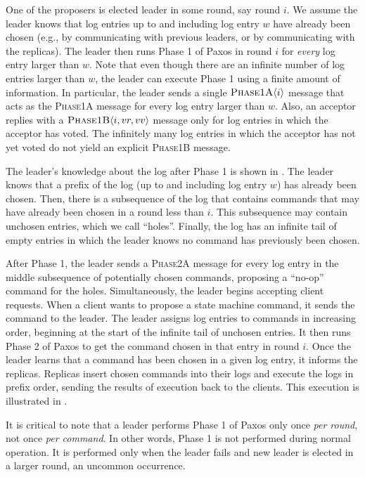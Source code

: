 One of the proposers is elected leader in some round, say round $i$. We assume
the leader knows that log entries up to and including log entry $w$ have
already been chosen (e.g., by communicating with previous leaders, or by
communicating with the replicas). The leader then runs Phase 1 of Paxos in
round $i$ for \emph{every} log entry larger than $w$. Note that even though
there are an infinite number of log entries larger than $w$, the leader can
execute Phase 1 using a finite amount of information.  In particular, the
leader sends a single $\textsc{Phase1A}\langle{i}\rangle$ message that acts as the \textsc{Phase1A}
message for every log entry larger than $w$. Also, an acceptor replies with a
$\textsc{Phase1B}\langle{i, vr, vv}\rangle$ message only for log entries in which the acceptor has
voted. The infinitely many log entries in which the acceptor has not yet voted
do not yield an explicit \textsc{Phase1B} message.

%

The leader's knowledge about the log after Phase 1 is shown in
. The leader knows that a prefix of the log (up to
and including log entry $w$) has already been chosen. Then, there is a
subsequence of the log that contains commands that may have already been chosen
in a round less than $i$. This subsequence may contain unchosen entries, which
we call ``holes''. Finally, the log has an infinite tail of empty entries in
which the leader knows no command has previously been chosen.

{}

After Phase 1, the leader sends a \textsc{Phase2A} message for every log entry
in the middle subsequence of potentially chosen commands, proposing a ``no-op''
command for the holes. Simultaneously, the leader begins accepting client
requests. When a client wants to propose a state machine command, it sends the
command to the leader. The leader assigns log entries to commands in increasing
order, beginning at the start of the infinite tail of unchosen entries. It then
runs Phase 2 of Paxos to get the command chosen in that entry in round $i$.
Once the leader learns that a command has been chosen in a given log entry, it
informs the replicas. Replicas insert chosen commands into their logs and
execute the logs in prefix order, sending the results of execution back to the
clients. This execution is illustrated in .

%

It is critical to note that a leader performs Phase 1 of Paxos only once
\emph{per round}, not once \emph{per command}. In other words, Phase 1 is not
performed during normal operation. It is performed only when
the leader fails and new leader is elected in a larger round, an uncommon
occurrence.
